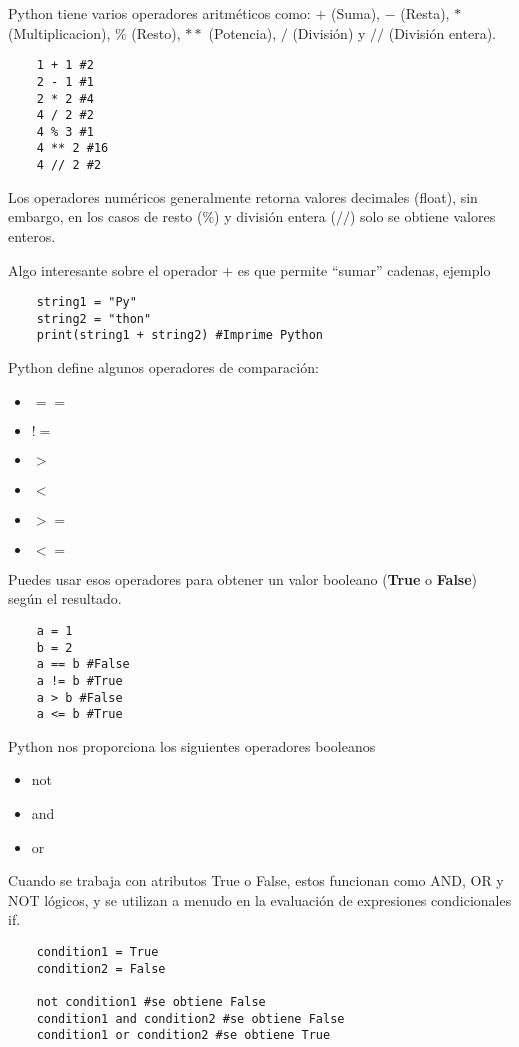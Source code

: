 \documentclass[12pt]{article}
\begin{document}
    Python tiene varios operadores aritméticos como: $+$ (Suma), $-$ (Resta), $*$ (Multiplicacion), $\%$ (Resto), $**$ (Potencia),
    $/$ (División) y $//$ (División entera).
    \begin{lstlisting}
    1 + 1 #2
    2 - 1 #1
    2 * 2 #4
    4 / 2 #2
    4 % 3 #1
    4 ** 2 #16
    4 // 2 #2
    \end{lstlisting}

    Los operadores numéricos generalmente retorna valores decimales (float), sin embargo, en los casos de resto ($\%$) y división entera ($//$)
    solo se obtiene valores enteros.

    Algo interesante sobre el operador $+$ es que permite ``sumar'' cadenas, ejemplo
    \begin{lstlisting}
    string1 = "Py"
    string2 = "thon"
    print(string1 + string2) #Imprime Python
    \end{lstlisting}

    Python define algunos operadores de comparación:
    \begin{itemize}
        \item $==$
        \item $!=$
        \item $>$
        \item $<$
        \item $>=$
        \item $<=$
    \end{itemize}
    Puedes usar esos operadores para obtener un valor booleano (\textbf{True} o \textbf{False}) según el resultado.

    \begin{lstlisting}
    a = 1
    b = 2
    a == b #False
    a != b #True
    a > b #False
    a <= b #True
    \end{lstlisting}

    Python nos proporciona los siguientes operadores booleanos
    \begin{itemize}
        \item not
        \item and
        \item or
    \end{itemize}
    Cuando se trabaja con atributos True o False, estos funcionan como AND, OR y NOT lógicos, y se utilizan a menudo en
    la evaluación de expresiones condicionales if.

    \begin{lstlisting}
    condition1 = True
    condition2 = False

    not condition1 #se obtiene False
    condition1 and condition2 #se obtiene False
    condition1 or condition2 #se obtiene True
    \end{lstlisting}
\end{document}
